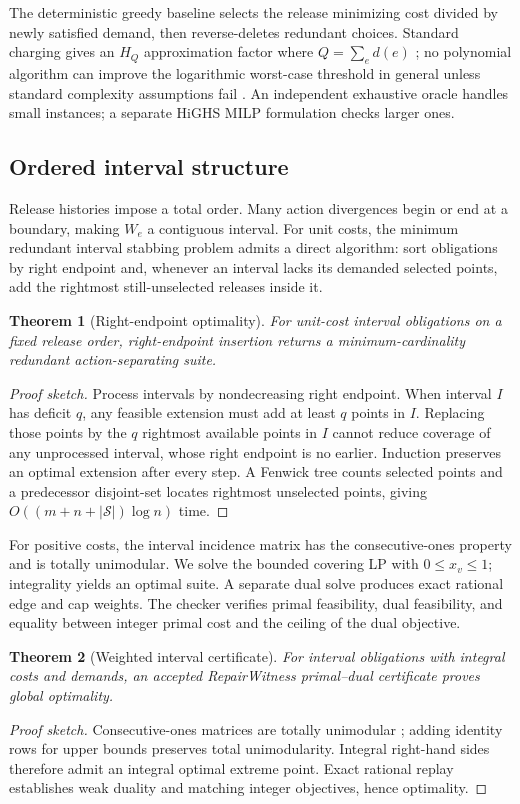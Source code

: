 \documentclass[10pt,conference]{IEEEtran}
\newtheorem{theorem}{Theorem}
\newcommand{\Suit}{\mathcal{S}}
\begin{document}
The deterministic greedy baseline selects the release minimizing cost divided by newly satisfied demand, then reverse-deletes redundant choices. Standard charging gives an $H_Q$ approximation factor where $Q=\sum_e d(e)$ \cite{chvatal1979greedy,wolsey1982submodular}; no polynomial algorithm can improve the logarithmic worst-case threshold in general unless standard complexity assumptions fail \cite{feige1998threshold}. An independent exhaustive oracle handles small instances; a separate HiGHS MILP formulation checks larger ones.

\subsection{Ordered interval structure}
Release histories impose a total order. Many action divergences begin or end at a boundary, making $W_e$ a contiguous interval. For unit costs, the minimum redundant interval stabbing problem admits a direct algorithm: sort obligations by right endpoint and, whenever an interval lacks its demanded selected points, add the rightmost still-unselected releases inside it.

\begin{theorem}[Right-endpoint optimality]
For unit-cost interval obligations on a fixed release order, right-endpoint insertion returns a minimum-cardinality redundant action-separating suite.
\end{theorem}
\begin{proof}[Proof sketch]
Process intervals by nondecreasing right endpoint. When interval $I$ has deficit $q$, any feasible extension must add at least $q$ points in $I$. Replacing those points by the $q$ rightmost available points in $I$ cannot reduce coverage of any unprocessed interval, whose right endpoint is no earlier. Induction preserves an optimal extension after every step. A Fenwick tree counts selected points and a predecessor disjoint-set locates rightmost unselected points, giving $O((m+n+|\Suit|)\log n)$ time.
\end{proof}

For positive costs, the interval incidence matrix has the consecutive-ones property and is totally unimodular. We solve the bounded covering LP with $0\leq x_v\leq1$; integrality yields an optimal suite. A separate dual solve produces exact rational edge and cap weights. The checker verifies primal feasibility, dual feasibility, and equality between integer primal cost and the ceiling of the dual objective.

\begin{theorem}[Weighted interval certificate]
For interval obligations with integral costs and demands, an accepted RepairWitness primal--dual certificate proves global optimality.
\end{theorem}
\begin{proof}[Proof sketch]
Consecutive-ones matrices are totally unimodular \cite{fulkerson1965interval}; adding identity rows for upper bounds preserves total unimodularity. Integral right-hand sides therefore admit an integral optimal extreme point. Exact rational replay establishes weak duality and matching integer objectives, hence optimality.
\end{proof}
\end{document}
